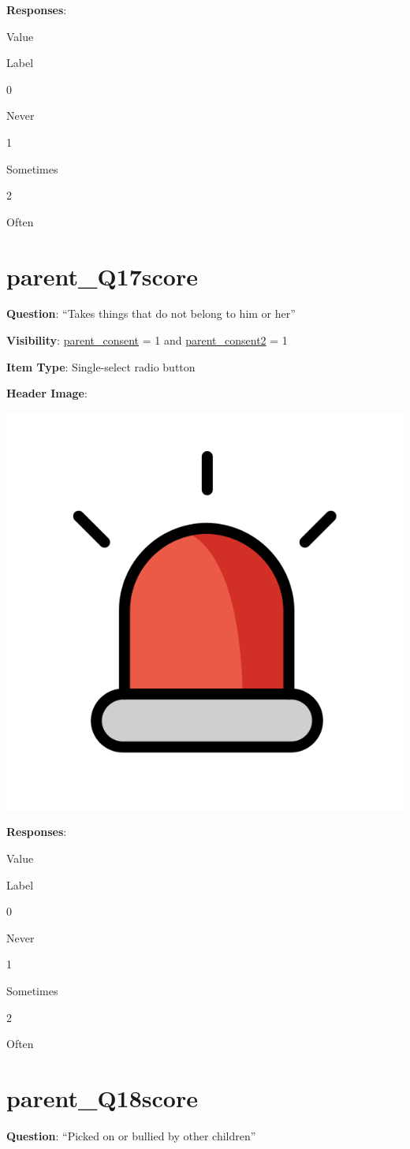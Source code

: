 \documentclass[]{book}
\begin{document}
\textbf{Responses}:

Value

Label

0

Never

1

Sometimes

2

Often

\hypertarget{parent_q17score}{%
\section{parent\_Q17score}\label{parent_q17score}}

\textbf{Question}: ``Takes things that do not belong to him or her''

\textbf{Visibility}: \protect\hyperlink{parent_consent}{parent\_consent} = 1 and \protect\hyperlink{parent_consent2}{parent\_consent2} = 1

\textbf{Item Type}: Single-select radio button

\textbf{Header Image}:

\begin{flushleft}\includegraphics[width=0.33\linewidth]{downloadFigs4latex_HBN_PMHS_Codebook/parent_Q17score_headerImg} \end{flushleft}

\textbf{Responses}:

Value

Label

0

Never

1

Sometimes

2

Often

\hypertarget{parent_q18score}{%
\section{parent\_Q18score}\label{parent_q18score}}

\textbf{Question}: ``Picked on or bullied by other children''
\end{document}
